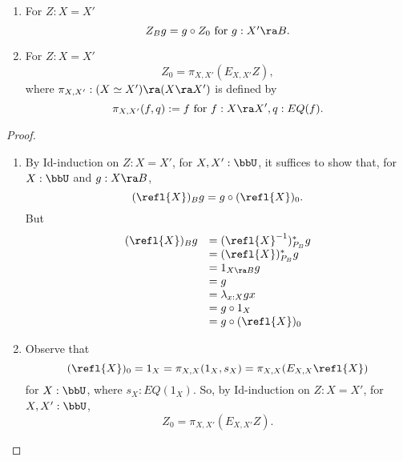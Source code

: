 \begin{lem} $\;$\label{lem:6.5}
\begin{enumerate}
\item For $Z:X=X'$ 
  \[ Z_Bg = g\circ Z_0 \mbox{ for $g:X'\ra B$}.\]
\item For $Z:X=X'$
  \[ Z_0 = \pi_{X,X'}(E_{X,X'}Z),\] 
where $\pi_{X,X'}:(X\simeq X')\ra (X\ra X')$ is defined by
  \[ \pi_{X,X'}(f,q):=f\mbox{ for } f:X\ra X', q:EQ(f).\]
\end{enumerate}
\end{lem}
\begin{proof}
\begin{enumerate}
\item By Id-induction on $Z:X=X'$, for $X,X':\bbU$, it suffices to show that, for $X:\bbU$ and $g:X\ra B$,
  \[ (\refl{X})_Bg = g\circ(\refl{X})_0.\]
But
  \[\begin{array}{ll}
(\refl{X})_Bg 
&= (\refl{X}^{-1})_{P_B}^*g\\
&= (\refl{X})_{P_B}^*g\\
&= 1_{X\ra B}g\\
&= g\\
&= \lambda_{x:X}gx\\
&= g\circ 1_X\\
&= g\circ (\refl{X})_0
\end{array}\]
\item Observe that 
  \[(\refl{X})_0=1_X=\pi_{X,X}(1_X,s_X)=\pi_{X,X}(E_{X,X}\refl{X})\]
for $X:\bbU$, where $s_X:EQ(1_X)$.  So, by Id-induction on $Z:X=X'$, for 
$X,X':\bbU$,
  \[ Z_0 = \pi_{X,X'}(E_{X,X'}Z).\]
\end{enumerate}
\end{proof}

